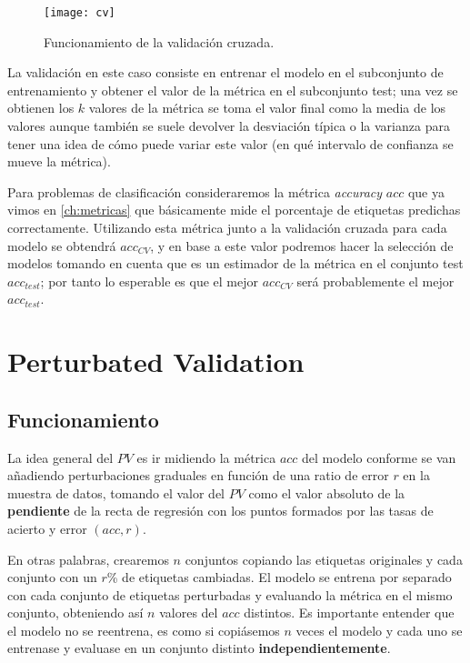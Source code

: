 \begin{figure}[htbp]
  \centering
  \texttt{[image: cv]}
  \caption{Funcionamiento de la validación cruzada.}
  \label{fig:cv}
\end{figure}


La validación en este caso consiste en entrenar el modelo en el subconjunto de entrenamiento y obtener el valor de la métrica en el subconjunto test; una vez se obtienen los $k$ valores de la métrica se toma el valor final como la media de los valores aunque también se suele devolver la desviación típica o la varianza para tener una idea de cómo puede variar este valor (en qué intervalo de confianza se mueve la métrica).

Para problemas de clasificación consideraremos la métrica \emph{accuracy} $acc$ que ya vimos en \autoref{ch:metricas} que básicamente mide el porcentaje de etiquetas predichas correctamente. Utilizando esta métrica junto a la validación cruzada para cada modelo se obtendrá $acc_{CV}$, y en base a este valor podremos hacer la selección de modelos tomando en cuenta que es un estimador de la métrica en el conjunto test $acc_{test}$; por tanto lo esperable es que el mejor $acc_{CV}$ será probablemente el mejor $acc_{test}$.

\section{Perturbated Validation}

\subsection{Funcionamiento}

La idea general del $PV$ es ir midiendo la métrica $acc$ del modelo conforme se van añadiendo perturbaciones graduales en función de una ratio de error $r$ en la muestra de datos, tomando el valor del $PV$ como el valor absoluto de la \textbf{pendiente} de la recta de regresión con los puntos formados por las tasas de acierto y error $(acc, r)$.

En otras palabras, crearemos $n$ conjuntos copiando las etiquetas originales y cada conjunto con un $r$\% de etiquetas cambiadas. El modelo se entrena por separado con cada conjunto de etiquetas perturbadas y evaluando la métrica en el mismo conjunto, obteniendo así $n$ valores del $acc$ distintos. Es importante entender que el modelo no se reentrena, es como si copiásemos $n$ veces el modelo y cada uno se entrenase y evaluase en un conjunto distinto \textbf{independientemente}.

